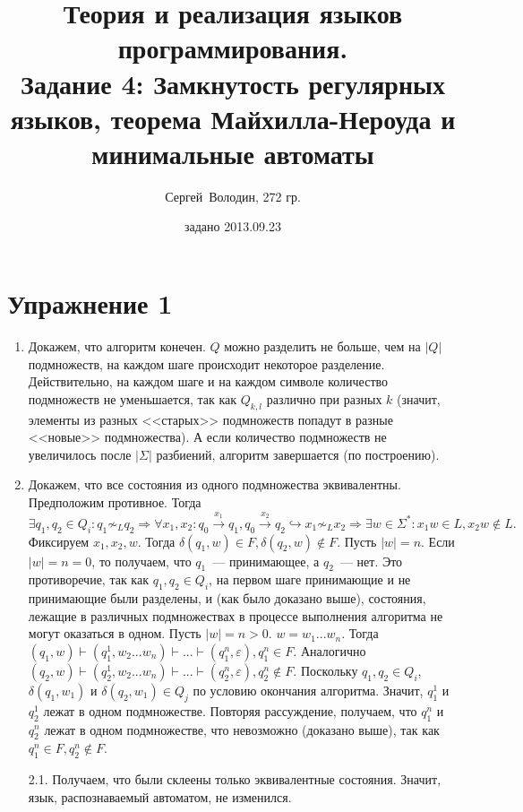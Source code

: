 \documentclass[a4paper]{article}
\title{Теория и реализация языков программирования.\\Задание 4: Замкнутость регулярных языков, теорема Майхилла-Нероуда и минимальные автоматы}
\date{задано 2013.09.23}
\author{Сергей~Володин, 272 гр.}
\begin{document}
\maketitle
\section*{Упражнение 1}
\begin{enumerate}[1.]
\item Докажем, что алгоритм конечен. $Q$ можно разделить не больше, чем на $|Q|$ подмножеств, на каждом шаге происходит некоторое разделение.\newline
Действительно, на каждом шаге и на каждом символе количество подмножеств не уменьшается, так как $Q_{k,l}$ различно при разных $k$ (значит, элементы из разных <<старых>> подмножеств попадут в разные <<новые>> подмножества).\newline
А если количество подмножеств не увеличилось после $|\Sigma|$ разбиений, алгоритм завершается (по построению).
\item Докажем, что все состояния из одного подмножества эквивалентны. Предположим противное. Тогда $$\exists q_1,q_2\in Q_i \colon q_1\not\sim_L q_2\Rightarrow \forall x_1,x_2\colon q_0\overset{x_1}{\longrightarrow}q_1, q_0\overset{x_2}{\longrightarrow}q_2\hookrightarrow x_1\not\sim_L x_2\Rightarrow \exists w\in\Sigma^*\colon x_1w\in L, x_2w\notin L.$$ Фиксируем $x_1,x_2,w$. Тогда $\delta(q_1,w)\in F, \delta(q_2,w)\notin F$. Пусть $|w|=n$.\newline
Если $|w|=n=0$, то получаем, что $q_1$~--- принимающее, а $q_2$~--- нет. Это противоречие, так как $q_1,q_2\in Q_i$, на первом шаге принимающие и не принимающие были разделены, и (как было доказано выше), состояния, лежащие в различных подмножествах в процессе выполнения алгоритма не могут оказаться в одном.\newline
Пусть $|w|=n>0$. $w=w_1...w_n$. Тогда $(q_1,w)\vdash(q^1_1,w_2...w_n)\vdash...\vdash(q^n_1,\varepsilon),q^n_1\in F$. Аналогично $(q_2,w)\vdash(q^1_2,w_2...w_n)\vdash...\vdash(q^n_2,\varepsilon),q^n_2\notin F$. Поскольку $q_1,q_2\in Q_i$, $\delta(q_1,w_1)$ и $\delta(q_2,w_1)\in Q_j$ по условию окончания алгоритма. Значит, $q^1_1$ и $q^1_2$ лежат в одном подмножестве. Повторяя рассуждение, получаем, что $q^n_1$ и $q^n_2$ лежат в одном подмножестве, что невозможно (доказано выше), так как $q^n_1\in F,q^n_2\notin F$.
\item[2.1.] Получаем, что были склеены только эквивалентные состояния. Значит, язык, распознаваемый автоматом, не изменился.

\end{enumerate}
\end{document}
